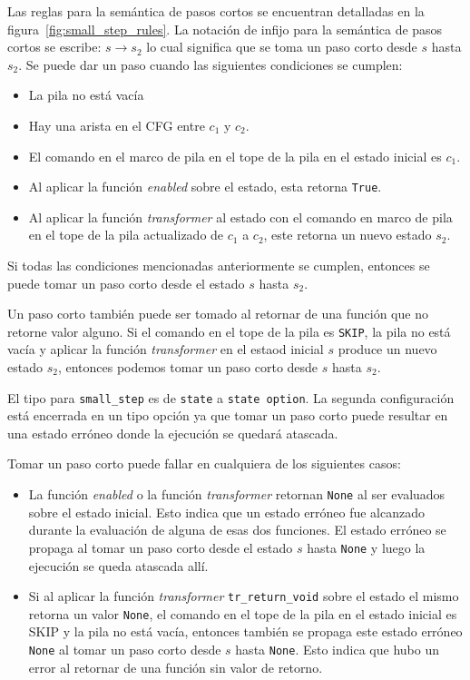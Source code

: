 Las reglas para la semántica de pasos cortos se encuentran detalladas en la figura~\ref{fig:small_step_rules}.
La notación de infijo para la semántica de pasos cortos se escribe: $s \rightarrow s_{2}$ lo cual significa que se toma un paso corto desde $s$ hasta $s_{2}$.
Se puede dar un paso cuando las siguientes condiciones se cumplen:

\begin{itemize}
  \item{La pila no está vacía}
  \item{Hay una arista en el CFG entre $c_{1}$ y $c_{2}$.}
  \item{El comando en el marco de pila en el tope de la pila en el estado inicial es $c_{1}$.}
  \item{Al aplicar la función \textit{enabled} sobre el estado, esta retorna \verb|True|.}
  \item{Al aplicar la función \textit{transformer} al estado con el comando en marco de pila en el tope de la pila actualizado de $c_{1}$ a $c_{2}$, este retorna un nuevo estado $s_{2}$.}
\end{itemize}

Si todas las condiciones mencionadas anteriormente se cumplen, entonces se puede tomar un paso corto desde el estado $s$ hasta $s_{2}$.

Un paso corto también puede ser tomado al retornar de una función que no retorne valor alguno.
Si el comando en el tope de la pila es \verb|SKIP|, la pila no está vacía y aplicar la función \textit{transformer} en el estaod inicial $s$ produce un nuevo estado $s_{2}$, entonces podemos tomar un paso corto desde $s$ hasta $s_{2}$.

El tipo para \verb|small_step| es de \verb|state| a \verb|state option|.
La segunda configuración está encerrada en un tipo opción ya que tomar un paso corto puede resultar en una estado erróneo donde la ejecución se quedará atascada.

Tomar un paso corto puede fallar en cualquiera de los siguientes casos:

\begin{itemize}
  \item{La función \textit{enabled} o la función \textit{transformer} retornan \verb|None| al ser evaluados sobre el estado inicial.
  Esto indica que un estado erróneo fue alcanzado durante la evaluación de alguna de esas dos funciones.
  El estado erróneo se propaga al tomar un paso corto desde el estado $s$ hasta \verb|None| y luego la ejecución se queda atascada allí.}
  \item{Si al aplicar la función \textit{transformer} \verb|tr_return_void| sobre el estado el mismo retorna un valor \verb|None|, el comando en el tope de la pila en el estado inicial es SKIP y la pila no está vacía, entonces también se propaga este estado erróneo \verb|None| al tomar un paso corto desde $s$ hasta \verb|None|.
  Esto indica que hubo un error al retornar de una función sin valor de retorno.}
\end{itemize}


